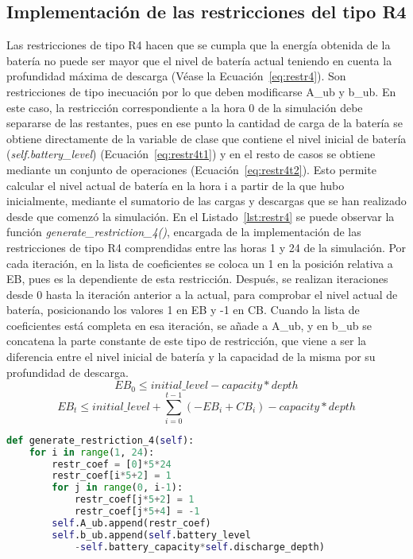 \subsection{Implementación de las restricciones del tipo R4}
Las restricciones de tipo R4 hacen que se cumpla que la energía obtenida de la batería no puede ser mayor que el nivel de batería actual teniendo en cuenta la profundidad máxima de descarga (Véase la Ecuación~\ref{eq:restr4}). Son restricciones de tipo inecuación por lo que deben modificarse A\_ub y b\_ub. En este caso, la restricción correspondiente a la hora 0 de la simulación debe separarse de las restantes, pues en ese punto la cantidad de carga de la batería se obtiene directamente de la variable de clase que contiene el nivel inicial de batería (\textit{self.battery\_level}) (Ecuación~\ref{eq:restr4t1}) y en el resto de casos se obtiene mediante un conjunto de operaciones (Ecuación~\ref{eq:restr4t2}). Esto permite calcular el nivel actual de batería en la hora i a partir de la que hubo inicialmente, mediante el sumatorio de las cargas y descargas que se han realizado desde que comenzó la simulación. En el Listado~\ref{lst:restr4} se puede observar la función \textit{generate\_restriction\_4()}, encargada de la implementación de las restricciones de tipo R4 comprendidas entre las horas 1 y 24 de la simulación. Por cada iteración, en la lista de coeficientes se coloca un 1 en la posición relativa a EB, pues es la dependiente de esta restricción. Después, se realizan iteraciones desde 0 hasta la iteración anterior a la actual, para comprobar el nivel actual de batería, posicionando los valores 1 en EB y -1 en CB. Cuando la lista de coeficientes está completa en esa iteración, se añade a A\_ub, y en b\_ub se concatena la parte constante de este tipo de restricción, que viene a ser la diferencia entre el nivel inicial de batería y la capacidad de la misma por su profundidad de descarga.
\begin{equation}
  \label{eq:restr4t1}
  EB_{0} \leq initial\_level - capacity * depth
\end{equation}
\begin{equation}
  \label{eq:restr4t2}
  EB_{t} \leq initial\_level + \sum_{i=0}^{t-1}(-EB_{i}+CB_{i}) - capacity * depth
\end{equation}
\begin{lstlisting}[language=Python,float=ht,caption={Restricciones del tipo R4},label={lst:restr4}]
def generate_restriction_4(self):
    for i in range(1, 24):
        restr_coef = [0]*5*24
        restr_coef[i*5+2] = 1
        for j in range(0, i-1):
            restr_coef[j*5+2] = 1
            restr_coef[j*5+4] = -1
        self.A_ub.append(restr_coef)
        self.b_ub.append(self.battery_level
            -self.battery_capacity*self.discharge_depth)
\end{lstlisting}
